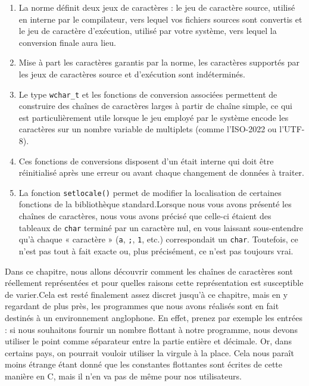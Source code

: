 \documentclass[]{article}
\providecommand{\tightlist}{%
  \setlength{\itemsep}{0pt}\setlength{\parskip}{0pt}}
\begin{document}
\begin{enumerate}
\def\labelenumi{\arabic{enumi}.}
\tightlist
\item
  La norme définit deux jeux de caractères : le jeu de caractère source,
  utilisé en interne par le compilateur, vers lequel vos fichiers
  sources sont convertis et le jeu de caractère d'exécution, utilisé par
  votre système, vers lequel la conversion finale aura lieu.
\item
  Mise à part les caractères garantis par la norme, les caractères
  supportés par les jeux de caractères source et d'exécution sont
  indéterminés.
\item
  Le type \texttt{wchar\_t} et les fonctions de conversion associées
  permettent de construire des chaînes de caractères larges à partir de
  chaîne simple, ce qui est particulièrement utile lorsque le jeu
  employé par le système encode les caractères sur un nombre variable de
  multiplets (comme l'ISO-2022 ou l'UTF-8).
\item
  Ces fonctions de conversions disposent d'un était interne qui doit
  être réinitialisé après une erreur ou avant chaque changement de
  données à traiter.
\item
  La fonction \texttt{setlocale()} permet de modifier la localisation de
  certaines fonctions de la bibliothèque standard.Lorsque nous vous
  avons présenté les chaînes de caractères, nous vous avons précisé que
  celle-ci étaient des tableaux de \texttt{char} terminé par un
  caractère nul, en vous laissant sous-entendre qu'à chaque « caractère
  » (\texttt{\textquotesingle{}a\textquotesingle{}},
  \texttt{\textquotesingle{};\textquotesingle{}},
  \texttt{\textquotesingle{}1\textquotesingle{}}, etc.) correspondait un
  \texttt{char}. Toutefois, ce n'est pas tout à fait exacte ou, plus
  précisément, ce n'est pas toujours vrai.
\end{enumerate}

Dans ce chapitre, nous allons découvrir comment les chaînes de
caractères sont réellement représentées et pour quelles raisons cette
représentation est susceptible de varier.Cela est resté finalement assez
discret jusqu'à ce chapitre, mais en y regardant de plus près, les
programmes que nous avons réalisés sont en fait destinés à un
environnement anglophone. En effet, prenez par exemple les entrées : si
nous souhaitons fournir un nombre flottant à notre programme, nous
devons utiliser le point comme séparateur entre la partie entière et
décimale. Or, dans certains pays, on pourrait vouloir utiliser la
virgule à la place. Cela nous paraît moins étrange étant donné que les
constantes flottantes sont écrites de cette manière en C, mais il n'en
va pas de même pour nos utilisateurs.
\end{document}
